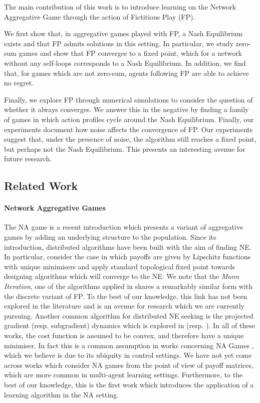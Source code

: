 \documentclass{article}
\theoremstyle{definition}
\begin{document}
  The main contribution of this work is to introduce learning on the Network Aggregative Game
  through the action of Fictitious Play (FP).

  We first show that, in aggregative games played with FP, a Nash Equilibrium exists and that FP admits
  solutions in this setting. In particular, we study zero-sum games and show that
  FP converges to a fixed point, which for a network without any
  self-loops corresponds to a Nash Equilibrium. In addition, we find that, for games
  which are not zero-sum, agents following FP are able to
  achieve no regret.

  Finally, we explore FP through numerical simulations to consider the
  question of whether it always converges. We answer this in the negative by finding a family of
  games in which action profiles cycle around the Nash Equilibrium. Finally, our experiments
  document how noise affects the convergence of FP. Our experiments suggest that, under
  the presence of noise, the algorithm still reaches a fixed point, but perhaps not the Nash
  Equilibrium. This presents an interesting avenue for future research.

\subsection{Related Work}

\paragraph{Network Aggregative Games}

The NA game is a recent introduction \cite{Parise2015} which presents a variant of aggregative games
by adding an underlying structure to the population. Since its introduction, distributed algorithms
have been built with the aim of finding NE. In particular, \cite{Parise2015, Parise2020} consider
the case in which payoffs are given by Lipschitz functions with unique minimisers and apply standard
topological fixed point towards designing algorithms which will converge to the NE. We note that the
\emph{Mann Iteration}, one of the algorithms applied in \cite{Parise2020} shares a remarkably
similar form with the discrete variant of FP. To the best of our knowledge, this link has not been
explored in the literature and is an avenue for research which we are currently pursuing. Another
common algorithm for distributed NE seeking is the projected gradient (resp. subgradient) dynamics
which is explored in \cite{Zhang2020} (resp. \cite{Shokri2020, Shokri2021}). In all of these works,
the cost function is assumed to be convex, and therefore have a unique minimiser. In fact this is a
common assumption in works concerning NA Games \cite{Zhu2021, Lei2020}, which we believe is due to
its ubiquity in control settings. We have not yet come across works which consider NA games from the
point of view of payoff matrices, which are more common in multi-agent learning settings.
Furthermore, to the best of our knowledge, this is the first work which introduces the application
of a learning algorithm in the NA setting.
\end{document}

